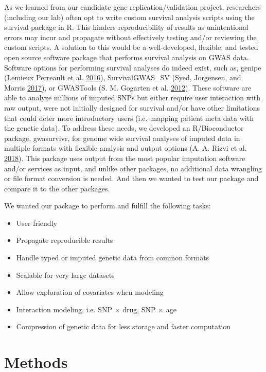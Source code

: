 \documentclass[]{DissertateOSU}
\begin{document}
As we learned from our candidate gene replication/validation project,
researchers (including our lab) often opt to write custom survival
analysis scripts using the survival package in R. This hinders
reproducibility of results as unintentional errors may incur and
propagate without effectively testing and/or reviewing the custom
scripts. A solution to this would be a well-developed, flexible, and
tested open source software package that performs survival analysis on
GWAS data. Software options for performing survival analyses do indeed
exist, such as, genipe (Lemieux Perreault et al.
\protect\hyperlink{ref-genipe}{2016}), SurvivalGWAS\_SV (Syed,
Jorgensen, and Morris \protect\hyperlink{ref-survivalgwas_sv}{2017}), or
GWASTools (S. M. Gogarten et al.
\protect\hyperlink{ref-gwastools}{2012}). These software are able to
analyze millions of imputed SNPs but either require user interaction
with raw output, were not initially designed for survival and/or have
other limitations that could deter more introductory users (i.e.~mapping
patient meta data with the genetic data). To address these needs, we
developed an R/Bioconductor package, gwasurvivr, for genome wide
survival analyses of imputed data in multiple formats with flexible
analysis and output options (A. A. Rizvi et al.
\protect\hyperlink{ref-Rizvi_2018}{2018}). This package uses output from
the most popular imputation software and/or services as input, and
unlike other packages, no additional data wrangling or file format
conversion is needed. And then we wanted to test our package and compare
it to the other packages.

We wanted our package to perform and fulfill the following tasks:

\begin{itemize}
    \item User friendly 
    \item Propagate reproducible results
    \item Handle typed or imputed genetic data from common formats 
    \item Scalable for very large datasets
    \item Allow exploration of covariates when modeling 
    \item Interaction modeling, i.e. SNP $\times$ drug, SNP $\times$ age
    \item Compression of genetic data for less storage and faster computation
\end{itemize}

\section{Methods}\label{methods-1}
\end{document}
